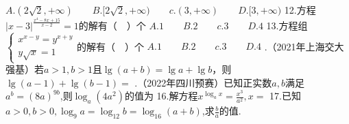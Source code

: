 \documentclass{article}
\begin{document}
$A.(2\sqrt{2},+\infty) \qquad B.[2\sqrt{2},+\infty) \qquad c.(3,+\infty) \qquad D.[3,+\infty)$ \newline
\newline
12.方程$|x-3|^{\frac{x^4-8x+15}{x-2}} = 1$的解有（$\quad$）个\newline
$A.1 \qquad B.2 \qquad c.3 \qquad D.4$ \newline
\newline
13.方程组$\begin{cases}x^{x-y} = y^{x+y}\\y\sqrt{x} = 1 \end{cases}$的解有（$\quad$）个\newline
$A.1 \qquad B.2 \qquad c.3 \qquad D.4$ \newline
{}.（2021年上海交大强基）若$a>1,b>1$且$\lg(a+b) = \lg a + \lg b$，则$\lg(a-1) + \lg(b-1) = $\newline
{}.（2022年四川预赛）已知正实数$a,b$满足$a^b = (8a)^{9b}$,则$\log_{a}(4a^2)$的值为\newline
\newline
16.解方程$x^{\log_{a}x} = \frac{x^3}{a^2},x=$\newline
\newline
17.已知$a>0,b>0,\log_{9}a = \log_{12}b = \log_{16}(a+b)$,求$\frac{b}{a}$的值.
\end{document}
